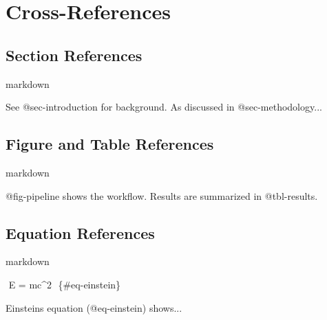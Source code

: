 \documentclass[
  11pt,
  letterpaper,
]{book}
\newenvironment{Shaded}{\begin{snugshade}}{\end{snugshade}}
\newcommand{\NormalTok}[1]{\textcolor[rgb]{0.00,0.23,0.31}{#1}}
\begin{document}
\section*{Cross-References}\label{cross-references}


\subsection*{Section References}\label{section-references}

markdown

\begin{Shaded}
\begin{Highlighting}[]
\NormalTok{See @sec{-}introduction for background.}
\NormalTok{As discussed in @sec{-}methodology...}
\end{Highlighting}
\end{Shaded}

\subsection*{Figure and Table
References}\label{figure-and-table-references}

markdown

\begin{Shaded}
\begin{Highlighting}[]
\NormalTok{@fig{-}pipeline shows the workflow.}
\NormalTok{Results are summarized in @tbl{-}results.}
\end{Highlighting}
\end{Shaded}

\subsection*{Equation References}\label{equation-references}

markdown

\begin{Shaded}
\begin{Highlighting}[]
\NormalTok{$$}
\NormalTok{E = mc\^{}2}
\NormalTok{$$ \{\#eq{-}einstein\}}

\NormalTok{Einstein\textquotesingle{}s equation (@eq{-}einstein) shows...}
\end{Highlighting}
\end{Shaded}
\end{document}
